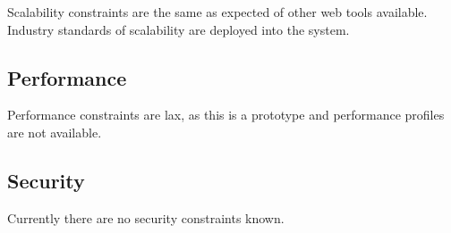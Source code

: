 \documentclass[11pt]{report}
\begin{document}
Scalability constraints are the same as expected of other web tools available. Industry standards of scalability are deployed into the system. 

\subsection{Performance}

Performance constraints are lax, as this is a prototype and performance profiles are not available. 

\subsection{Security} 

Currently there are no security constraints known. 


{}
\end{document}
